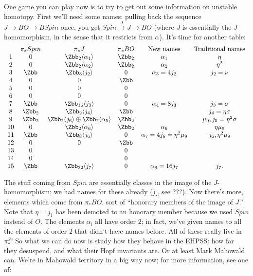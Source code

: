 One game you can play now is to try to get out some information on unstable homotopy.  First we'll need some names: pulling back the sequence $J \to BO \to BSpin$ once, you get $Spin \xrightarrow{J} J \to BO$ (where $J$ is essentially the $J$-homomorphism, in the sense that it restricts from $\alpha$).  It's time for another table:
\[
\begin{array}{cccccc}
& \pi_* Spin & \pi_* J & \pi_* BO & \hbox{New names} & \hbox{Traditional names} \\
1 & 0 & \Zbb_2 \langle \alpha_1 \rangle & \Zbb_2 & \alpha_1 & \eta \\
2 & 0 & \Zbb_2 \langle \alpha_2 \rangle & \Zbb_2 & \alpha_2 & \eta^2 \\
3 & \Zbb & \Zbb_8 \langle j_2  \rangle & 0 & \alpha_3 = 4 j_2 & j_2 = \nu \\
4 & 0 & 0 & \Zbb \\
5 & 0 & 0 & 0 \\
6 & 0 & 0 & 0 \\
7 & \Zbb & \Zbb_{16} \langle j_3 \rangle & 0 & \alpha_4 = 8j_3 & j_3 = \sigma \\
8 & \Zbb_2 & \Zbb_2 \langle j_4 \rangle & \Zbb & & j_4 = \eta \sigma \\
9 & \Zbb_2 & \Zbb_2 \langle j_6 \rangle \oplus \Zbb_2 \langle \alpha_5 \rangle & \Zbb_2 & & \mu_9, j_5 = \eta^2 \sigma \\
10 & 0 & \Zbb_2 \langle \alpha_6 \rangle & \Zbb_2 & \alpha_6 & \eta \mu_9 \\
11 & \Zbb & \Zbb_8 \langle j_6 \rangle & 0 & \alpha_7 = 4 j_6 = \eta^2 \mu_9 & j_6, \eta^2 \mu_9 \\
12 & 0 & 0 & \Zbb \\
13 & 0 & & 0 \\
14 & 0 & & 0 \\
15 & \Zbb & \Zbb_{32} \langle j_7 \rangle & 0 & \alpha_8 = 16j_7 & j_7.
\end{array}
\]

The stuff coming from $Spin$ are essentially classes in the image of the $J$-homomorphism; we had names for these already ($j_i$, see ???).  Now there's more, elements which come from $\pi_* BO$, sort of ``honorary members of the image of $J$.''  Note that $\eta = j_1$ has been demoted to an honorary member because we used $Spin$ instead of $O$.  The elements $\alpha_i$ all have order $2$; in fact, we've given names to all the elements of order $2$ that didn't have names before.  All of these really live in $\pi_*^S$!  So what we can do now is study how they behave in the EHPSS: how far they desuspend, and what their Hopf invariants are.  Or at least Mark Mahowald can.  We're in Mahowald territory in a big way now; for more information, see one of:

